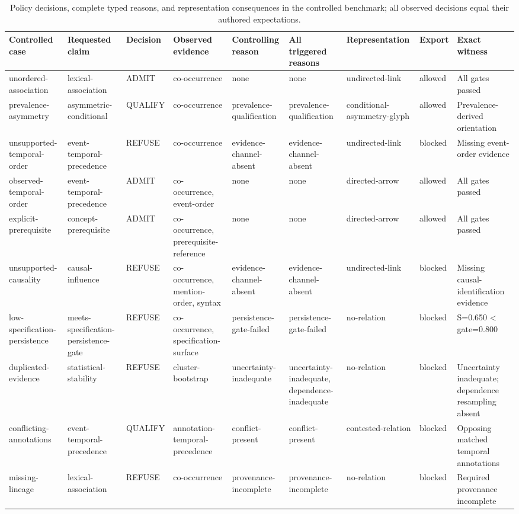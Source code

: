 \begin{table}[t]
  \caption{Policy decisions, complete typed reasons, and representation consequences in the controlled benchmark; all observed decisions equal their authored expectations.}
  \label{tab:claim-benchmark}
  \centering
  \scriptsize
  \setlength{\tabcolsep}{1.2pt}
  \begin{tabular}{@{}p{}p{}p{}p{}p{}p{}p{}p{}p{}@{}}
    \toprule
    Controlled case & Requested claim & Decision & Observed evidence & Controlling reason & All triggered reasons & Representation & Export & Exact witness \\
    \midrule
    unordered-association & lexical-association & ADMIT & co-occurrence & none & none & undirected-link & allowed & All gates passed \\
    prevalence-asymmetry & asymmetric-conditional & QUALIFY & co-occurrence & prevalence-qualification & prevalence-qualification & conditional-asymmetry-glyph & allowed & Prevalence-derived orientation \\
    unsupported-temporal-order & event-temporal-precedence & REFUSE & co-occurrence & evidence-channel-absent & evidence-channel-absent & undirected-link & blocked & Missing event-order evidence \\
    observed-temporal-order & event-temporal-precedence & ADMIT & co-occurrence, event-order & none & none & directed-arrow & allowed & All gates passed \\
    explicit-prerequisite & concept-prerequisite & ADMIT & co-occurrence, prerequisite-reference & none & none & directed-arrow & allowed & All gates passed \\
    unsupported-causality & causal-influence & REFUSE & co-occurrence, mention-order, syntax & evidence-channel-absent & evidence-channel-absent & undirected-link & blocked & Missing causal-identification evidence \\
    low-specification-persistence & meets-specification-persistence-gate & REFUSE & co-occurrence, specification-surface & persistence-gate-failed & persistence-gate-failed & no-relation & blocked & S=0.650 < gate=0.800 \\
    duplicated-evidence & statistical-stability & REFUSE & cluster-bootstrap & uncertainty-inadequate & uncertainty-inadequate, dependence-inadequate & no-relation & blocked & Uncertainty inadequate; dependence resampling absent \\
    conflicting-annotations & event-temporal-precedence & QUALIFY & annotation-temporal-precedence & conflict-present & conflict-present & contested-relation & blocked & Opposing matched temporal annotations \\
    missing-lineage & lexical-association & REFUSE & co-occurrence & provenance-incomplete & provenance-incomplete & no-relation & blocked & Required provenance incomplete \\
    \bottomrule
  \end{tabular}
\end{table}
